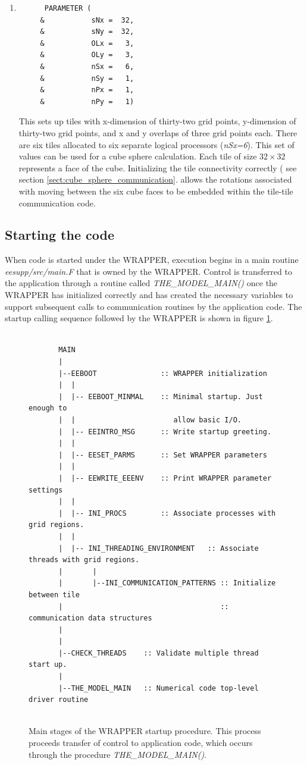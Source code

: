 \begin{enumerate}
\item
\begin{verbatim}
      PARAMETER (
     &           sNx =  32,
     &           sNy =  32,
     &           OLx =   3,
     &           OLy =   3,
     &           nSx =   6,
     &           nSy =   1,
     &           nPx =   1,
     &           nPy =   1)
\end{verbatim}
This sets up tiles with x-dimension of thirty-two grid points, y-dimension of
thirty-two grid points, and x and y overlaps of three grid points each. 
There are six tiles allocated to six separate logical processors ({\em nSx=6}).
This set of values can be used for a cube sphere calculation.
Each tile of size $32 \times 32$ represents a face of the
cube. Initializing the tile connectivity correctly ( see section
\ref{sect:cube_sphere_communication}. allows the rotations associated with
moving between the six cube faces to be embedded within the 
tile-tile communication code.
\end{enumerate}


\subsection{Starting the code}
\label{sect:starting_the_code}
When code is started under the WRAPPER, execution begins in a main routine {\em
eesupp/src/main.F} that is owned by the WRAPPER. Control is transferred 
to the application through a routine called {\em THE\_MODEL\_MAIN()}
once the WRAPPER has initialized correctly and has created the necessary variables
to support subsequent calls to communication routines
by the application code. The startup calling sequence followed by the 
WRAPPER is shown in figure \ref{fig:wrapper_startup}.

\begin{figure}
{\footnotesize
\begin{verbatim}

       MAIN  
       |
       |--EEBOOT               :: WRAPPER initialization
       |  |
       |  |-- EEBOOT_MINMAL    :: Minimal startup. Just enough to
       |  |                       allow basic I/O.
       |  |-- EEINTRO_MSG      :: Write startup greeting.
       |  |
       |  |-- EESET_PARMS      :: Set WRAPPER parameters
       |  |
       |  |-- EEWRITE_EEENV    :: Print WRAPPER parameter settings
       |  |
       |  |-- INI_PROCS        :: Associate processes with grid regions.
       |  |
       |  |-- INI_THREADING_ENVIRONMENT   :: Associate threads with grid regions.
       |       |
       |       |--INI_COMMUNICATION_PATTERNS :: Initialize between tile 
       |                                     :: communication data structures
       |
       |
       |--CHECK_THREADS    :: Validate multiple thread start up.
       |
       |--THE_MODEL_MAIN   :: Numerical code top-level driver routine


\end{verbatim}
}
\caption{Main stages of the WRAPPER startup procedure.
This process proceeds transfer of control to application code, which
occurs through the procedure {\em THE\_MODEL\_MAIN()}.
} \label{fig:wrapper_startup}
\end{figure}

